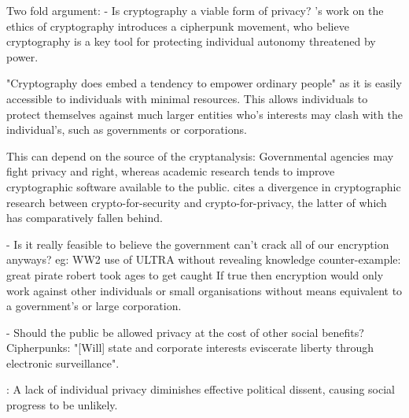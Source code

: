 \documentclass[british,10pt,a4paper]{article}
\begin{document}
Two fold argument:
- Is cryptography a viable form of privacy?
	\citet{Rogaway}'s work on the ethics of cryptography introduces a cipherpunk movement, who believe cryptography is a key tool for protecting individual autonomy threatened by power.

	\cite{Rogaway} "Cryptography does embed a tendency to empower ordinary people" as it is easily accessible to individuals with minimal resources. This allows individuals to protect themselves against much larger entities who's interests may clash with the individual's, such as governments or corporations.

	\cite{Rogaway} This can depend on the source of the cryptanalysis: Governmental agencies may fight privacy and right, whereas academic research tends to improve cryptographic software available to the public. \citet{Narayanan} cites a divergence in cryptographic research between crypto-for-security and crypto-for-privacy, the latter of which has comparatively fallen behind.

- Is it really feasible to believe the government can't crack all of our encryption anyways?
 	eg: WW2 use of ULTRA without revealing knowledge
 	counter-example: great pirate robert took ages to get caught
 	If true then encryption would only work against other individuals or small organisations without means equivalent to a government's or large corporation.

- Should the public be allowed privacy at the cost of other social benefits?
	\citet{Rogaway} Cipherpunks: "[Will] state and corporate interests eviscerate liberty through electronic surveillance".

	\citet{Rogaway}: A lack of individual privacy diminishes effective political dissent, causing social progress to be unlikely.




\end{document}
